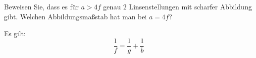 \subsection{}
Beweisen Sie, dass es für $a > 4f$ genau $2$ Linsenstellungen mit scharfer Abbildung
gibt. 
Welchen Abbildungsmaßstab hat man bei $a = 4f$?

Es gilt:
\begin{equation*}
\frac{1}{f} = \frac{1}{g} + \frac{1}{b}
\tag{100.1}
\label{eq:100.1}
\end{equation*}